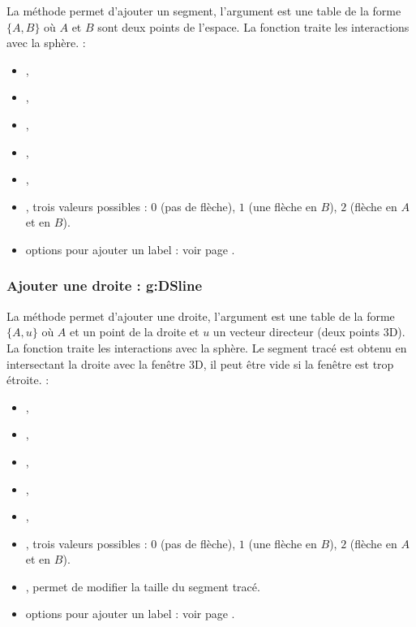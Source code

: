 La méthode  permet d'ajouter un segment, l'argument  est une table de la forme $\{A,B\}$ où $A$ et $B$ sont deux points de l'espace. La fonction traite les interactions avec la sphère. \writeoptions :
    \begin{itemize}
        \item {}, 
        \item {},
        \item {},
        \item {},
        \item {},
        \item {}, trois valeurs possibles : $0$ (pas de flèche), $1$ (une flèche en $B$), $2$ (flèche en $A$ et en $B$).
        \item options pour ajouter un label : voir page \pageref{addlabel}.
    \end{itemize}
    
\subsubsection{Ajouter une droite : g:DSline}

La méthode  permet d'ajouter une droite, l'argument  est une table de la forme $\{A,u\}$ où $A$ et un point de la droite et $u$ un vecteur directeur (deux points 3D). La fonction traite les interactions avec la sphère. Le segment tracé est obtenu en intersectant la droite avec la fenêtre 3D, il peut être vide si la fenêtre est trop étroite. \writeoptions :
    \begin{itemize}
        \item {}, 
        \item {},
        \item {},
        \item {},
        \item {},
        \item {}, trois valeurs possibles : $0$ (pas de flèche), $1$ (une flèche en $B$), $2$ (flèche en $A$ et en $B$).
        \item {}, permet de modifier la taille du segment tracé.
        \item options pour ajouter un label : voir page \pageref{addlabel}.
    \end{itemize}
    
